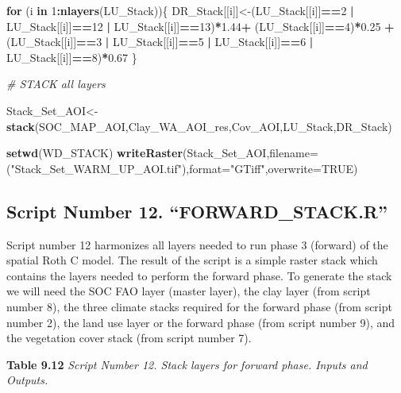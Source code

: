 \documentclass[
  10pt,
  b5paper,
]{book}
\newenvironment{Shaded}{\begin{snugshade}}{\end{snugshade}}
\newcommand{\CommentTok}[1]{\textcolor[rgb]{0.56,0.35,0.01}{\textit{#1}}}
\newcommand{\ControlFlowTok}[1]{\textcolor[rgb]{0.13,0.29,0.53}{\textbf{#1}}}
\newcommand{\DataTypeTok}[1]{\textcolor[rgb]{0.13,0.29,0.53}{#1}}
\newcommand{\DecValTok}[1]{\textcolor[rgb]{0.00,0.00,0.81}{#1}}
\newcommand{\FloatTok}[1]{\textcolor[rgb]{0.00,0.00,0.81}{#1}}
\newcommand{\KeywordTok}[1]{\textcolor[rgb]{0.13,0.29,0.53}{\textbf{#1}}}
\newcommand{\NormalTok}[1]{#1}
\newcommand{\OperatorTok}[1]{\textcolor[rgb]{0.81,0.36,0.00}{\textbf{#1}}}
\newcommand{\OtherTok}[1]{\textcolor[rgb]{0.56,0.35,0.01}{#1}}
\newcommand{\StringTok}[1]{\textcolor[rgb]{0.31,0.60,0.02}{#1}}
\begin{document}
\begin{Shaded}
\begin{Highlighting}[]
\ControlFlowTok{for}\NormalTok{ (i }\ControlFlowTok{in} \DecValTok{1}\OperatorTok{:}\KeywordTok{nlayers}\NormalTok{(LU_Stack))\{}
\NormalTok{DR_Stack[[i]]<-(LU_Stack[[i]]}\OperatorTok{==}\DecValTok{2} \OperatorTok{|}\StringTok{ }\NormalTok{LU_Stack[[i]]}\OperatorTok{==}\DecValTok{12} \OperatorTok{|}\StringTok{ }\NormalTok{LU_Stack[[i]]}\OperatorTok{==}\DecValTok{13}\NormalTok{)}\OperatorTok{*}\FloatTok{1.44}\OperatorTok{+}\StringTok{ }\NormalTok{(LU_Stack[[i]]}\OperatorTok{==}\DecValTok{4}\NormalTok{)}\OperatorTok{*}\FloatTok{0.25} \OperatorTok{+}\StringTok{ }\NormalTok{(LU_Stack[[i]]}\OperatorTok{==}\DecValTok{3} \OperatorTok{|}\StringTok{ }\NormalTok{LU_Stack[[i]]}\OperatorTok{==}\DecValTok{5} \OperatorTok{|}\StringTok{ }\NormalTok{LU_Stack[[i]]}\OperatorTok{==}\DecValTok{6} \OperatorTok{|}\StringTok{ }\NormalTok{LU_Stack[[i]]}\OperatorTok{==}\DecValTok{8}\NormalTok{)}\OperatorTok{*}\FloatTok{0.67}
\NormalTok{\}}

\CommentTok{# STACK all layers}

\NormalTok{Stack_Set_AOI<-}\KeywordTok{stack}\NormalTok{(SOC_MAP_AOI,Clay_WA_AOI_res,Cov_AOI,LU_Stack,DR_Stack)}

\KeywordTok{setwd}\NormalTok{(WD_STACK)}
\KeywordTok{writeRaster}\NormalTok{(Stack_Set_AOI,}\DataTypeTok{filename=}\NormalTok{(}\StringTok{"Stack_Set_WARM_UP_AOI.tif"}\NormalTok{),}\DataTypeTok{format=}\StringTok{"GTiff"}\NormalTok{,}\DataTypeTok{overwrite=}\OtherTok{TRUE}\NormalTok{)}
\end{Highlighting}
\end{Shaded}

\hypertarget{script-number-12.-forward_stack.r}{%
\subsection{Script Number 12. ``FORWARD\_STACK.R''}\label{script-number-12.-forward_stack.r}}

Script number 12 harmonizes all layers needed to run phase 3 (forward) of the spatial Roth C model. The result of the script is a simple raster stack which contains the layers needed to perform the forward phase. To generate the stack we will need the SOC FAO layer (master layer), the clay layer (from script number 8), the three climate stacks required for the forward phase (from script number 2), the land use layer or the forward phase (from script number 9), and the vegetation cover stack (from script number 7).

\textbf{Table 9.12} \emph{Script Number 12. Stack layers for forward phase. Inputs and Outputs.}
\end{document}
